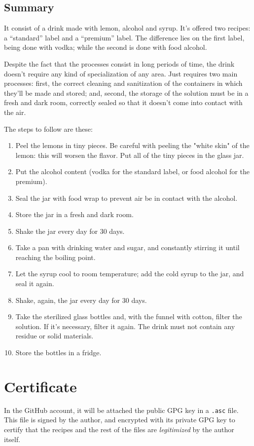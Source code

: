 \documentclass[12pt,a4paper]{article}
\begin{document}
\subsection{Summary}
It consist of a drink made with lemon, alcohol and syrup. It's offered two recipes: a “standard” label and a “premium” label. The difference lies on the first label, being done with vodka; while the second is done with food alcohol.

Despite the fact that the processes consist in long periods of time, the drink doesn't require any kind of specialization of any area. Just requires two main processes: first, the correct cleaning and sanitization of the containers in which they'll be made and stored; and, second, the storage of the solution must be in a fresh and dark room, correctly sealed so that it doesn't come into contact with the air.

The steps to follow are these:

\begin{enumerate}
\item Peel the lemons in tiny pieces. Be careful with peeling the "white skin" of the lemon: this will worsen the flavor. Put all of the tiny pieces in the glass jar.
\item Put the alcohol content (vodka for the standard label, or food alcohol for the premium).
\item Seal the jar with food wrap to prevent air be in contact with the alcohol.
\item Store the jar in a fresh and dark room.
\item Shake the jar every day for 30 days.
\item Take a pan with drinking water and sugar, and constantly stirring it until reaching the boiling point.
\item Let the syrup cool to room temperature; add the cold syrup to the jar, and seal it again.
\item Shake, again, the jar every day for 30 days.
\item Take the sterilized glass bottles and, with the funnel with cotton, filter the solution. If it's necessary, filter it again. The drink must not contain any residue or solid materials.
\item Store the bottles in a fridge.
\end{enumerate}

\section{Certificate}
In the GitHub account, it will be attached the public GPG key in a \texttt{.asc} file. This file is signed by the author, and encrypted with its private GPG key to certify that the recipes and the rest of the files are \textit{legitimized} by the author itself.
\end{document}
